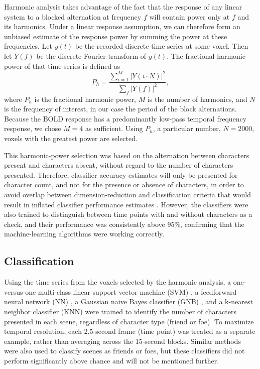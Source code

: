 \documentclass[5p,authoryear]{elsarticle}
\begin{document}
Harmonic analysis takes advantage of the fact that the response of any linear system to a blocked alternation at frequency $f$ will contain power only at $f$ and its harmonics. 
Under a linear response assumption, we can therefore form an unbiased estimate of the response power by summing the power at these frequencies. 
Let $y(t)$ be the recorded discrete time series at some voxel.
Then let $Y(f)$ be the discrete Fourier transform of $y(t)$.
The fractional harmonic power of that time series is defined as
\begin{equation}
P_h = \frac{\sum_{i = 1}^{M}{\left|Y(i \cdot N)\right|^{2}}}{\sum_{f}{\left|Y(f)\right|^{2}}},
\end{equation}
where $P_h$ is the fractional harmonic power, $M$ is the number of harmonics, and $N$ is the frequency of interest, in our case the period of the block alternations. 
Because the BOLD response has a predominantly low-pass temporal frequency response, we chose $M = 4$ as sufficient. 
Using $P_h$, a particular number, $N = 2000$, voxels with the greatest power are selected. 

This harmonic-power selection was based on the alternation between characters present and characters absent, without regard to the number of characters presented. 
Therefore, classifier accuracy estimates will only be presented for character count, and not for the presence or absence of characters, in order to avoid overlap between dimension-reduction and  classification criteria that would result in inflated classifier performance estimates \citep{Pereira2009}.
However, the classifiers were also trained to distinguish between time points with and without characters as a check, and their performance was consistently above 95\%, confirming that the machine-learning algorithms were working correctly.

\subsection{Classification}
Using the time series from the voxels selected by the harmonic analysis, a one-versus-one multi-class linear support vector machine (SVM) \citep{Cortes1995,Weston1999}, a feedforward neural network (NN) \citep{Hornik1989,Hagan1994}, a Gaussian naive Bayes classifier (GNB) \citep{Duda1973}, and a k-nearest neighbor classifier (KNN) \citep{Cover1967} were trained to identify the number of characters presented in each scene, regardless of character type (friend or foe).
To maximize temporal resolution, each 2.5-second frame (time point) was treated as a separate example, rather than averaging across the 15-second blocks.
Similar methods were also used to classify scenes as friends or foes, but these classifiers did not perform significantly above chance and will not be mentioned further.
\end{document}

